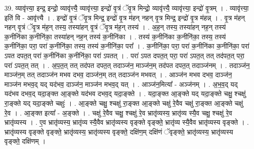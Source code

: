 \documentclass[17pt]{extarticle}
\begin{document}
39. व्यावृ॑त्त्या॒ इन्द्र॒ इन्द्रो॒ व्यावृ॑त्त्यै॒ व्यावृ॑त्त्या॒ इन्द्रो॑ वृ॒त्रं ॅवृ॒त्र मिन्द्रो॒ व्यावृ॑त्त्यै॒ व्यावृ॑त्त्या॒ इन्द्रो॑ वृ॒त्रम् । . व्यावृ॑त्त्या॒ इति॑ वि - आवृ॑त्त्यै । . इन्द्रो॑ वृ॒त्रं ॅवृ॒त्र मिन्द्र॒ इन्द्रो॑ वृ॒त्र म॑हन् नहन् वृ॒त्र मिन्द्र॒ इन्द्रो॑ वृ॒त्र म॑हन्न् । . वृ॒त्र म॑हन् नहन् वृ॒त्रं ॅवृ॒त्र म॑ह॒न् तस्य॒ तस्या॑हन् वृ॒त्रं ॅवृ॒त्र म॑ह॒न् तस्य॑ । . अ॒ह॒न् तस्य॒ तस्या॑हन् नह॒न् तस्य॑ क॒नीनि॑का क॒नीनि॑का॒ तस्या॑हन् नह॒न् तस्य॑ क॒नीनि॑का । . तस्य॑ क॒नीनि॑का क॒नीनि॑का॒ तस्य॒ तस्य॑ क॒नीनि॑का॒ परा॒ परा॑ क॒नीनि॑का॒ तस्य॒ तस्य॑ क॒नीनि॑का॒ परा᳚ । . क॒नीनि॑का॒ परा॒ परा॑ क॒नीनि॑का क॒नीनि॑का॒ परा॑ ऽपत दपत॒त् परा॑ क॒नीनि॑का क॒नीनि॑का॒ परा॑ ऽपतत् । . परा॑ ऽपत दपत॒त् परा॒ परा॑ ऽपत॒त् तत् तद॑पत॒त् परा॒ परा॑ ऽपत॒त् तत् । . अ॒प॒त॒त् तत् तद॑पत दपत॒त् तदाञ्ज॑न॒ माञ्ज॑न॒म् तद॑पत दपत॒त् तदाञ्ज॑नम् । . तदाञ्ज॑न॒ माञ्ज॑न॒म् तत् तदाञ्ज॑न मभव दभव॒ दाञ्ज॑न॒म् तत् तदाञ्ज॑न मभवत् । . आञ्ज॑न मभव दभव॒ दाञ्ज॑न॒ माञ्ज॑न मभव॒द् यद् यद॑भव॒ दाञ्ज॑न॒ माञ्ज॑न मभव॒द् यत् । . आञ्ज॑न॒मित्या᳚ - अञ्ज॑नम् । . अ॒भ॒व॒द् यद् यद॑भव दभव॒द् यदा॒ङ्क्त आ॒ङ्क्ते यद॑भव दभव॒द् यदा॒ङ्क्ते । . यदा॒ङ्क्त आ॒ङ्क्ते यद् यदा॒ङ्क्ते चक्षु॒ श्चक्षु॑ रा॒ङ्क्ते यद् यदा॒ङ्क्ते चक्षुः॑ । . आ॒ङ्क्ते चक्षु॒ श्चक्षु॑ रा॒ङ्क्त आ॒ङ्क्ते चक्षु॑ रे॒वैव चक्षु॑ रा॒ङ्क्त आ॒ङ्क्ते चक्षु॑ रे॒व । . आ॒ङ्क्त इत्या᳚ - अ॒ङ्क्ते । . चक्षु॑ रे॒वैव चक्षु॒ श्चक्षु॑ रे॒व भ्रातृ॑व्यस्य॒ भ्रातृ॑व्य स्यै॒व चक्षु॒ श्चक्षु॑ रे॒व भ्रातृ॑व्यस्य । . ए॒व भ्रातृ॑व्यस्य॒ भ्रातृ॑व्य स्यै॒वैव भ्रातृ॑व्यस्य वृङ्क्ते वृङ्क्ते॒ भ्रातृ॑व्य स्यै॒वैव भ्रातृ॑व्यस्य वृङ्क्ते । . भ्रातृ॑व्यस्य वृङ्क्ते वृङ्क्ते॒ भ्रातृ॑व्यस्य॒ भ्रातृ॑व्यस्य वृङ्क्ते॒ दक्षि॑ण॒म् दक्षि॑णं ॅवृङ्क्ते॒ भ्रातृ॑व्यस्य॒ भ्रातृ॑व्यस्य वृङ्क्ते॒ दक्षि॑णम् । \newline
\end{document}
